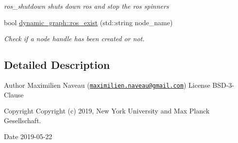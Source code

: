 \begin{DoxyCompactItemize}
\begin{DoxyCompactList}\small\item\em ros\+\_\+shutdown shuts down ros and stop the ros spinners \end{DoxyCompactList}\item 
bool \hyperlink{namespacedynamic__graph_ab000cd6e1e6ed365a5a3e1adddf89dff}{dynamic\+\_\+graph\+::ros\+\_\+exist} (std\+::string node\+\_\+name)\hypertarget{namespacedynamic__graph_ab000cd6e1e6ed365a5a3e1adddf89dff}{}\label{namespacedynamic__graph_ab000cd6e1e6ed365a5a3e1adddf89dff}

\begin{DoxyCompactList}\small\item\em Check if a node handle has been created or not. \end{DoxyCompactList}\end{DoxyCompactItemize}


\subsection{Detailed Description}
\begin{DoxyAuthor}{Author}
Maximilien Naveau (\href{mailto:maximilien.naveau@gmail.com}{\tt maximilien.\+naveau@gmail.\+com})  License B\+S\+D-\/3-\/\+Clause 
\end{DoxyAuthor}
\begin{DoxyCopyright}{Copyright}
Copyright (c) 2019, New York University and Max Planck Gesellschaft. 
\end{DoxyCopyright}
\begin{DoxyDate}{Date}
2019-\/05-\/22 
\end{DoxyDate}
